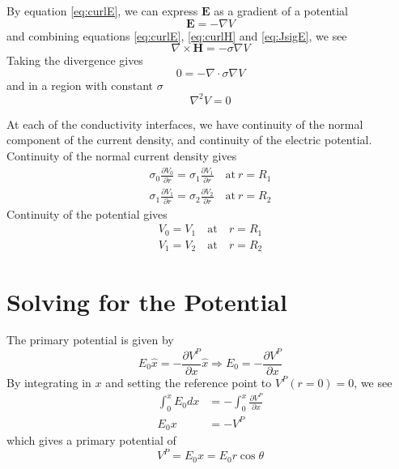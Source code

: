 By equation \ref{eq:curlE}, we can express $\mathbf{E}$ as a gradient of a potential
    \begin{equation}
        \mathbf{E} = -\nabla V
        \label{eq:V}
    \end{equation}
and combining equations \ref{eq:curlE}, \ref{eq:curlH} and \ref{eq:JsigE}, we see
$$\nabla \times \mathbf{H} = -\sigma \nabla V$$
Taking the divergence gives
$$0 = - \nabla \cdot \sigma \nabla V$$
and in a region with constant $\sigma$
    \begin{equation}
        \nabla^2 V = 0
        \label{eq:laplace}
    \end{equation}

At each of the conductivity interfaces, we have continuity of the normal component of the current density, and continuity of the electric potential. Continuity of the normal current density gives
    \begin{align}
    \sigma_0 \frac{\partial V_0}{\partial r} = \sigma_1 \frac{\partial V_1}{\partial r} \quad \text{at} ~r = R_1 \label{eq:cntsJR1} \\
    \sigma_1 \frac{\partial V_1}{\partial r} = \sigma_2 \frac{\partial V_2}{\partial r} \quad \text{at} ~r = R_2 \label{eq:cntsJR2}
    \end{align}
Continuity of the potential gives
\begin{align}
V_0 = V_1 \quad \text{at} &~r = R_1 \label{eq:cntsVR1}\\
V_1 = V_2 \quad \text{at} &~r = R_2 \label{eq:cntsVR2}
\end{align}


\section{Solving for the Potential}
The primary potential is given by
$$
E_0 \hat{x} = -\frac{\partial V^P}{\partial x} \hat{x} \Rightarrow E_0 = -\frac{\partial V^P}{\partial x}
$$
By integrating in $x$ and setting the reference point to $V^P(r=0) = 0$, we see
    \begin{displaymath}
        \begin{split}
        \int_0^x E_0 dx &= -\int_0^x \frac{\partial V^P}{\partial x} \\
        E_0 x &= -V^P
        \end{split}
    \end{displaymath}
which gives a primary potential of
    \begin{equation}
        V^P = E_0x = E_0 r \cos\theta
    \end{equation}

